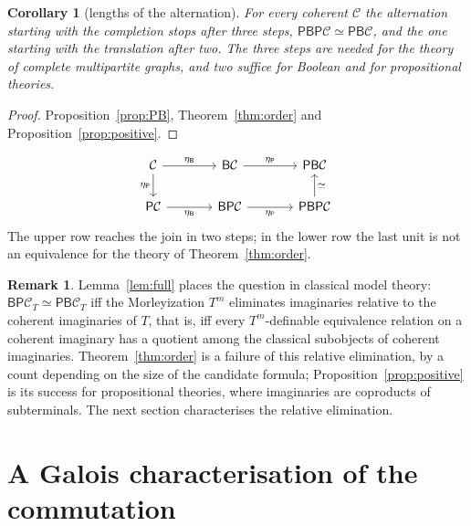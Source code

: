 \documentclass[11pt]{amsart}
\newtheorem{cor}[thm]{Corollary}
\theoremstyle{definition}
\newtheorem{rem}[thm]{Remark}
\newcommand{\PP}{\mathsf P}
\newcommand{\BB}{\mathsf B}
\newcommand{\cC}{\mathcal C}
\begin{document}
\begin{cor}[lengths of the alternation]\label{cor:length}
For every coherent $\cC$ the alternation starting with the completion
stops after three steps, $\PP\BB\PP\cC\simeq\PP\BB\cC$, and the one
starting with the translation after two. The three steps are needed for
the theory of complete multipartite graphs, and two suffice for Boolean
and for propositional theories.
\end{cor}
\begin{proof}
Proposition~\ref{prop:PB}, Theorem~\ref{thm:order} and
Proposition~\ref{prop:positive}.
\end{proof}

\begin{equation*}
\begin{tikzcd}[column sep=large]
\cC \arrow[r, "\eta_\BB"] \arrow[d, "\eta_\PP"'] & \BB\cC \arrow[r, "\eta_\PP"] & \PP\BB\cC \\
\PP\cC \arrow[r, "\eta_\BB"'] & \BB\PP\cC \arrow[r, "\eta_\PP"'] & \PP\BB\PP\cC \arrow[u, "\simeq"']
\end{tikzcd}
\end{equation*}
The upper row reaches the join in two steps; in the lower row the last
unit is not an equivalence for the theory of Theorem~\ref{thm:order}.

\begin{rem}
Lemma~\ref{lem:full} places the question in classical model theory:
$\BB\PP\cC_T\simeq\PP\BB\cC_T$ iff the Morleyization $T^m$ eliminates
imaginaries relative to the coherent imaginaries of $T$, that is, iff
every $T^m$-definable equivalence relation on a coherent imaginary has
a quotient among the classical subobjects of coherent imaginaries.
Theorem~\ref{thm:order} is a failure of this relative elimination, by a
count depending on the size of the candidate formula; Proposition~\ref{prop:positive} is its success for
propositional theories, where imaginaries are coproducts of
subterminals. The next section characterises the relative elimination.
\end{rem}

\section{A Galois characterisation of the commutation}\label{sec:galois}
\end{document}

